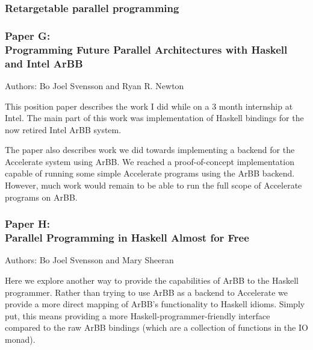 \documentclass[a4paper]{book}
\newcommand{\paperG}{Paper G}
\newcommand{\paperGTitle}{Programming Future Parallel Architectures with Haskell and Intel ArBB}
\newcommand{\paperH}{Paper H}
\newcommand{\paperHTitle}{Parallel Programming in Haskell Almost for Free}
\begin{document}
\subsubsection{Retargetable parallel programming} 

\subsubsection{\paperG: \\ \paperGTitle}

Authors: Bo Joel Svensson and Ryan R. Newton

\vspace{5mm}

\noindent This position paper describes the work I did while on a 3 month internship at 
Intel. The main part of this work was implementation of Haskell bindings 
for the now retired Intel ArBB system. 

The paper also describes work we did towards implementing a backend for the 
Accelerate system using ArBB. We reached a proof-of-concept implementation 
capable of running some simple Accelerate programs using the ArBB backend.
However, much work would remain to be able to run the full scope of Accelerate 
programs on ArBB.  

\subsubsection{\paperH: \\ \paperHTitle}

Authors: Bo Joel Svensson and Mary Sheeran 

\vspace{5mm}

\noindent Here we explore another way to provide the capabilities of ArBB to the 
Haskell programmer. Rather than trying to use ArBB as a backend to Accelerate 
we provide a more direct mapping of ArBB's functionality to Haskell idioms. 
Simply put, this means providing a more Haskell-programmer-friendly interface compared
to the raw ArBB bindings (which are a collection of functions in the IO monad). 






\clearpage{}

%
%
\end{document}
